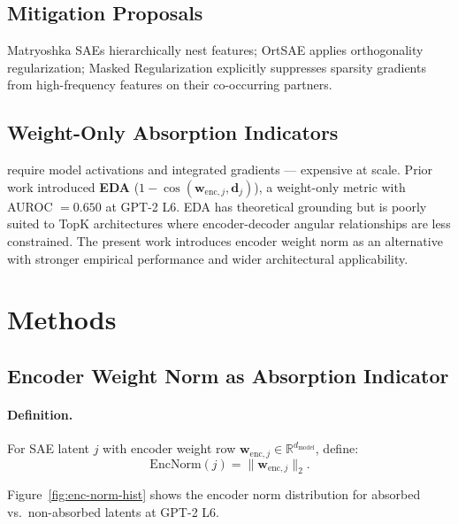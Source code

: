 \documentclass{article}
\begin{document}
\subsection{Mitigation Proposals}

Matryoshka SAEs \citep{bussmann2025matryoshka} hierarchically nest features;
OrtSAE \citep{korznikov2025ortsae} applies orthogonality regularization;
Masked Regularization \citep{narayanaswamy2026masked} explicitly suppresses sparsity
gradients from high-frequency features on their co-occurring partners.

\subsection{Weight-Only Absorption Indicators}

\citet{chanin2024absorption} require model activations and integrated gradients --- expensive
at scale. Prior work introduced \textbf{EDA} ($1 - \cos(\mathbf{w}_{\mathrm{enc},j},\mathbf{d}_j)$),
a weight-only metric with AUROC $= 0.650$ at GPT-2 L6. EDA has theoretical grounding but is
poorly suited to TopK architectures where encoder-decoder angular relationships are less
constrained. The present work introduces encoder weight norm as an alternative with stronger
empirical performance and wider architectural applicability.

\section{Methods}
\label{sec:method}

\subsection{Encoder Weight Norm as Absorption Indicator}

\paragraph{Definition.} For SAE latent $j$ with encoder weight row
$\mathbf{w}_{\mathrm{enc},j} \in \mathbb{R}^{d_\mathrm{model}}$, define:
\begin{equation}
\mathrm{EncNorm}(j) = \|\mathbf{w}_{\mathrm{enc},j}\|_2.
\end{equation}

Figure~\ref{fig:enc-norm-hist} shows the encoder norm distribution for absorbed vs.\
non-absorbed latents at GPT-2 L6.
\end{document}
